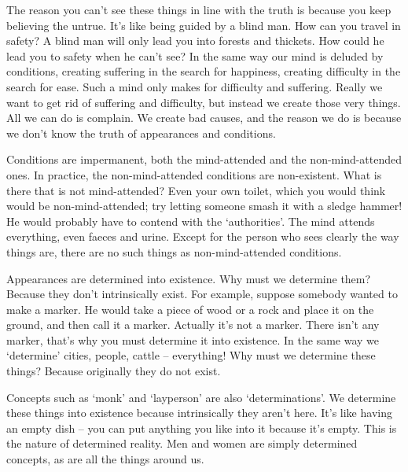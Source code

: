 The reason you can't see these things in line with the truth is because you keep believing the untrue. It's like being guided by a blind man. How can you travel in safety? A blind man will only lead you into forests and thickets. How could he lead you to safety when he can't see? In the same way our mind is deluded by conditions, creating suffering in the search for happiness, creating difficulty in the search for ease. Such a mind only makes for difficulty and suffering. Really we want to get rid of suffering and difficulty, but instead we create those very things. All we can do is complain. We create bad causes, and the reason we do is because we don't know the truth of appearances and conditions. 

Conditions are impermanent, both the mind-attended and the non-mind-attended ones. In practice, the non-mind-attended conditions are non-exist\-ent. What is there that is not mind-attended? Even your own toilet, which you would think would be non-mind-attended; try letting someone smash it with a sledge hammer! He would probably have to contend with the `authorities'. The mind attends everything, even faeces and urine. Except for the person who sees clearly the way things are, there are no such things as non-mind-attended conditions. 

Appearances are determined into existence. Why must we determine them? Because they don't intrinsically exist. For example, suppose somebody wanted to make a marker. He would take a piece of wood or a rock and place it on the ground, and then call it a marker. Actually it's not a marker. There isn't any marker, that's why you must determine it into existence. In the same way we `determine' cities, people, cattle -- everything! Why must we determine these things? Because originally they do not exist. 

Concepts such as `monk' and `layperson' are also `determinations'. We determine these things into existence because intrinsically they aren't here. It's like having an empty dish -- you can put anything you like into it because it's empty. This is the nature of determined reality. Men and women are simply determined concepts, as are all the things around us. 

